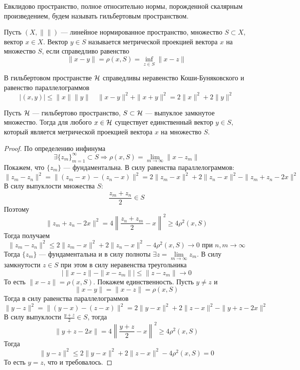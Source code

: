 \begin{definition}
	Евклидово пространство, полное относительно нормы, порожденной скалярным произведением, будем называть гильбертовым пространством.
\end{definition}
\begin{definition}
	Пусть $(X,\|\|)$ --- линейное нормированное пространство, множество $S \subset X$, вектор $x \in X$. Вектор $y \in S$ называется метрической проекцией вектора $x$ на множество $S$, если справедливо равенство
	$$
	\|x-y\| = \rho(x,S) = \inf_{z \in S} \|x - z\|
	$$
\end{definition}
\begin{claim}
	В гильбертовом пространстве $\mathcal{H}$ справедливы неравенство Коши-Буняковского и равенство параллелограммов
	$$
	|(x,y)| \leq \|x\|\|y\| \quad \|x - y\|^2 + \|x + y\|^2 = 2\|x\|^2 + 2\|y\|^2
	$$
\end{claim}
\begin{theorem}
	Пусть $\mathcal{H}$ --- гильбертово пространство, $S \subset \mathcal{H}$ --- выпуклое замкнутое множество. Тогда для любого $x \in \mathcal{H}$ существует единственный вектор $y \in S$, который является метрической проекцией вектора $x$ на множество $S$.
\end{theorem}
\begin{proof}
	По определению инфинума 
	$$
	\exists \{z_m\}_{m=1}^\infty \subset S \Rightarrow \rho(x,S) = \lim\limits_{m \to \infty} \|x - z_m\|
	$$
	Покажем, что $\{z_m\}$ --- фундаментальна. В силу равенства параллелограммов:
	$$
	\|z_m - z_n\|^2 = \|(z_m - x)  - (z_n - x)\|^2 = 2\|z_m - x\|^2 + 2\|z_n - x\|^2 - \|z_m + z_n - 2x\|^2 
	$$
	В силу выпуклости множества $S$:
	$$
	\frac{z_m + z_n}{2} \in S
	$$
	Поэтому 
	$$
	\|z_m + z_n -2x\|^2 = 4\left\| \frac{z_n+z_m}{2} - x\right\|^2 \geq 4\rho^2(x,S)
	$$
	Тогда получаем
	$$
	\|z_m - z_n\|^2 \leq 2\|z_m - x\|^2 + 2\|z_n - x\|^2 - 4\rho^2(x,S) \to 0 \text{ при } n,m \to \infty
	$$
	Тогда $\{z_m\}$ --- фундаментальна и в силу полноты $\exists z = \lim\limits_{m \to \infty} z_m$. В силу замкнутости $z \in S$ при этом в силу неравенства треугольника 
	$$
	|\|x-z\| - \|x - z_m\|| \leq \|z - z_m\| \to 0
	$$
	То есть $\|x - z\| = \rho(x,S)$. Покажем единственность. Пусть $y \neq z$ и 
	$$
	\|x - y\| = \|x - z\| = \rho(x,S)
	$$
	Тогда в силу равенства параллелограммов 
	$$
	\|y - z\|^2 = \|(y-x) - (z - x)\|^2 = 2\|y -x\|^2 + 2 \|z - x\|^2 - \|y + z - 2x\|^2
	$$
	В силу выпуклости $\frac{y + z}{2} \in S$, тогда 
	$$
	\|y + z - 2x\| = 4\left\|\frac{y + z}{2} - x\right\|^2 \geq 4 \rho^2(x,S)
	$$
	Тогда 
	$$
	\|y -z\|^2 \leq 2\|y - x\|^2 + 2\|z-x\|^2 - 4\rho^2(x,S) = 0
	$$
	То есть $y = z$, что и требовалось. 
\end{proof}


